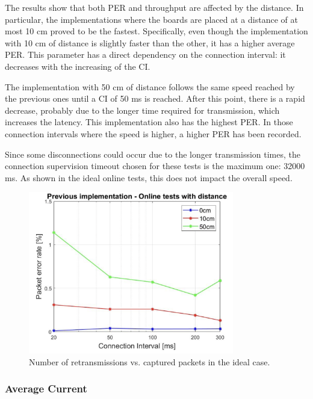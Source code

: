 \documentclass{Configuration_Files/PoliMi3i_thesis}
\begin{document}
The results show that both PER and throughput are affected by the distance. In particular, the implementations where the boards are placed at a distance of at most 10 cm proved to be the fastest. Specifically, even though the implementation with 10 cm of distance is slightly faster than the other, it has a higher average PER. This parameter has a direct dependency on the connection interval: it decreases with the increasing of the CI.

The implementation with 50 cm of distance follows the same speed reached by the previous ones until a CI of 50 ms is reached. After this point, there is a rapid decrease, probably due to the longer time required for transmission, which increases the latency. This implementation also has the highest PER. In those connection intervals where the speed is higher, a higher PER has been recorded.

Since some disconnections could occur due to the longer transmission times, the connection supervision timeout chosen for these tests is the maximum one: 32000 ms. As shown in the ideal online tests, this does not impact the overall speed.

\begin{figure}[h!]
    \centering
    \includegraphics[width=0.8\textwidth]{Results Manuel/figure5}
    \caption{Number of retransmissions vs. captured packets in the ideal case.}
    \label{fig:figure1}
\end{figure}

\subsubsection*{Average Current}
\end{document}
